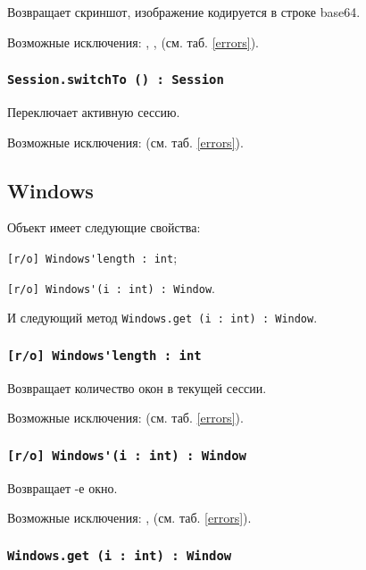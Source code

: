 Возвращает скриншот, изображение кодируется в строке base64.

Возможные исключения: , ,  (см. таб. \ref{errors}).

\subsubsection{\lstinline|Session.switchTo () : Session|}

Переключает активную сессию.

Возможные исключения:  (см. таб. \ref{errors}).


\subsection{{\color{orange} Windows}}

Объект \windows{} имеет следующие свойства:
\begin{icItems}
	\item \lstinline|[r/o] Windows'length : int|;
	\item \lstinline|[r/o] Windows'(i : int) : Window|.
\end{icItems}

И следующий метод \lstinline|Windows.get (i : int) : Window|.

\subsubsection{\lstinline|[r/o] Windows'length : int|}

Возвращает количество окон в текущей сессии.

Возможные исключения:  (см. таб. \ref{errors}).

\subsubsection{\lstinline|[r/o] Windows'(i : int) : Window|}

Возвращает -е окно.

Возможные исключения: ,  (см. таб. \ref{errors}).

\subsubsection{\lstinline|Windows.get (i : int) : Window|}

